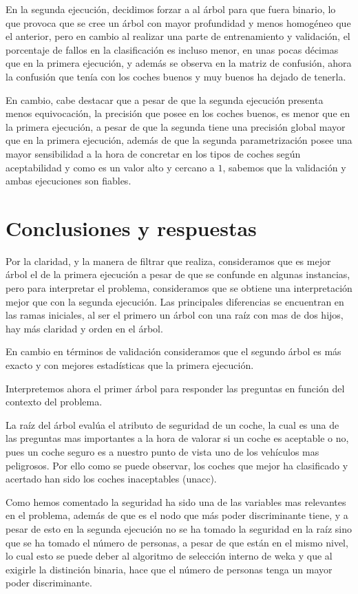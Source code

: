 \documentclass[a4paper, 11pt, twoside, openany, onecolumn, final]{memoir}
\begin{document}
	En la segunda ejecución, decidimos forzar a al árbol para que fuera binario, lo que provoca que se cree un  árbol con mayor profundidad y menos homogéneo que el anterior, pero en cambio al realizar una parte de entrenamiento y validación, el porcentaje de fallos en la clasificación es incluso menor, en unas pocas décimas que en la primera ejecución, y además se observa en la matriz de confusión, ahora la confusión que tenía con los coches buenos y muy buenos ha dejado de tenerla. 
	
	En cambio, cabe destacar que a pesar de que la segunda ejecución presenta menos equivocación, la precisión que posee en los coches buenos, es menor que en la primera ejecución, a pesar de que la segunda tiene una precisión global mayor que en la primera ejecución, además de que la segunda parametrización posee una mayor sensibilidad a la hora de concretar en los tipos de coches según aceptabilidad y como es un valor alto y cercano a $1$, sabemos que la validación y ambas ejecuciones son fiables.
	
	\section{Conclusiones y respuestas}
	Por la claridad, y la manera de filtrar que realiza, consideramos que es mejor árbol el de la primera ejecución a pesar de que se confunde en algunas instancias, pero para interpretar el problema, consideramos que se obtiene una interpretación mejor que con la segunda ejecución. Las principales diferencias se encuentran en las ramas iniciales, al ser el primero un árbol con una raíz con mas de dos hijos, hay más claridad y orden en el árbol. 
	
	En cambio en términos de validación consideramos que el segundo árbol es más exacto y con mejores estadísticas que la primera ejecución.
	
	Interpretemos ahora el primer árbol para responder las preguntas en función del contexto del problema.
	
	La raíz del árbol evalúa el atributo de seguridad de un coche, la cual es una de las preguntas mas importantes a la hora de valorar si un coche es aceptable o no, pues un coche seguro es a nuestro punto de vista uno de los vehículos mas peligrosos. Por ello como se puede observar, los coches que mejor ha clasificado y acertado han sido los coches inaceptables (unacc).
	
	Como hemos comentado la seguridad ha sido una de las variables mas relevantes en el problema, además de que es el nodo que más poder discriminante tiene, y a pesar de esto en la segunda ejecución no se ha tomado la seguridad en la raíz sino que se ha tomado el número de personas, a pesar de que están en el mismo nivel, lo cual esto se puede deber al algoritmo de selección interno de weka y que al exigirle la distinción binaria, hace que el número de personas tenga un mayor poder discriminante.   
	
\end{document}
